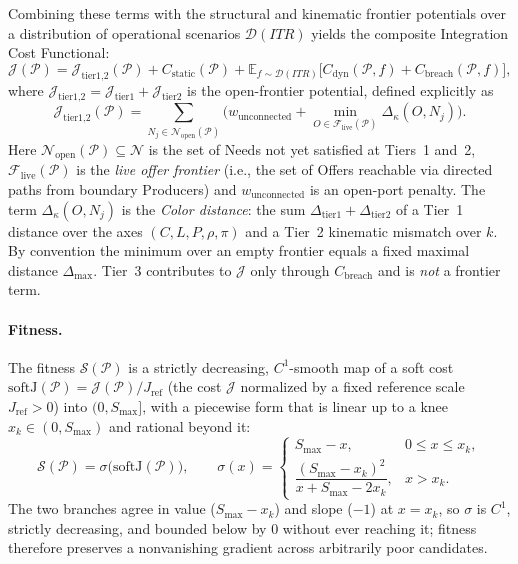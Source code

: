 Combining these terms with the structural and kinematic frontier potentials over a distribution of operational scenarios $\mathcal{D}(ITR)$ yields the composite Integration Cost Functional:
\begin{equation}
    \mathcal{J}(\mathcal{P}) = \mathcal{J}_{\text{tier1,2}}(\mathcal{P}) + C_{\text{static}}(\mathcal{P}) + \mathbb{E}_{f \sim \mathcal{D}(ITR)}\!\Big[ C_{\text{dyn}}(\mathcal{P}, f) + C_{\text{breach}}(\mathcal{P}, f) \Big],
    \label{eq:j-total}
\end{equation}
where $\mathcal{J}_{\text{tier1,2}} = \mathcal{J}_{\text{tier1}} + \mathcal{J}_{\text{tier2}}$ is the open-frontier potential, defined explicitly as
\begin{equation}
    \mathcal{J}_{\text{tier1,2}}(\mathcal{P}) = \sum_{N_j \in \mathcal{N}_{\text{open}}(\mathcal{P})} \Big( w_{\text{unconnected}} + \min_{O \in \mathcal{F}_{\text{live}}(\mathcal{P})} \Delta_{\kappa}(O, N_j) \Big).
    \label{eq:j-frontier}
\end{equation}
Here $\mathcal{N}_{\text{open}}(\mathcal{P}) \subseteq \mathcal{N}$ is the set of Needs not yet satisfied at Tiers~1 and~2, $\mathcal{F}_{\text{live}}(\mathcal{P})$ is the \emph{live offer frontier} (i.e., the set of Offers reachable via directed paths from boundary Producers) and $w_{\text{unconnected}}$ is an open-port penalty.  The term $\Delta_{\kappa}(O, N_j)$ is the \emph{Color distance}: the sum $\Delta_{\text{tier1}} + \Delta_{\text{tier2}}$ of a Tier~1 distance over the axes $(C, L, P, \rho, \pi)$ and a Tier~2 kinematic mismatch over $k$.  By convention the minimum over an empty frontier equals a fixed maximal distance $\Delta_{\max}$.  Tier~3 contributes to $\mathcal{J}$ only through $C_{\text{breach}}$ and is \emph{not} a frontier term.

\paragraph{Fitness.} The fitness $\mathcal{S}(\mathcal{P})$ is a strictly decreasing, $C^1$-smooth map of a soft cost $\mathrm{softJ}(\mathcal{P}) = \mathcal{J}(\mathcal{P}) / J_{\text{ref}}$ (the cost $\mathcal{J}$ normalized by a fixed reference scale $J_{\text{ref}} > 0$) into $(0, S_{\max}]$, with a piecewise form that is linear up to a knee $x_k \in (0, S_{\max})$ and rational beyond it:
\begin{equation}
    \mathcal{S}(\mathcal{P}) = \sigma\big(\mathrm{softJ}(\mathcal{P})\big), \qquad
    \sigma(x) =
    \begin{cases}
        S_{\max} - x, & 0 \le x \le x_k, \\[3pt]
        \dfrac{(S_{\max} - x_k)^2}{x + S_{\max} - 2x_k}, & x > x_k.
    \end{cases}
    \label{eq:fitness-S}
\end{equation}
The two branches agree in value ($S_{\max} - x_k$) and slope ($-1$) at $x = x_k$, so $\sigma$ is $C^1$, strictly decreasing, and bounded below by $0$ without ever reaching it; fitness therefore preserves a nonvanishing gradient across arbitrarily poor candidates.

